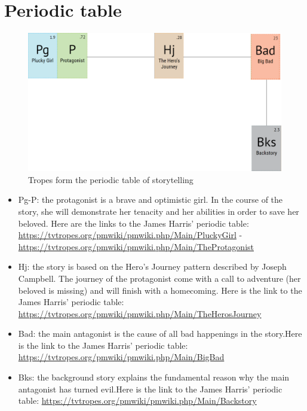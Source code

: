 \section{Periodic table}

\begin{figure}[H]
  \centering
  \includegraphics[width=\textwidth]{Images/Diagrams/periodicTable}
  \caption{Tropes form the periodic table of storytelling}
\end{figure}

\begin{itemize}
\item Pg-P: the protagonist is a brave and optimistic girl. In the course of the story, she will demonstrate her tenacity and her abilities in order to save her beloved. Here are the links to the James Harris' periodic table: \url{https://tvtropes.org/pmwiki/pmwiki.php/Main/PluckyGirl} - \url{https://tvtropes.org/pmwiki/pmwiki.php/Main/TheProtagonist}

\item Hj: the story is based on the Hero's Journey pattern described by Joseph Campbell. The journey of the protagonist come with a call to adventure (her beloved is missing) and will finish with a homecoming. Here is the link to the James Harris' periodic table: \url{https://tvtropes.org/pmwiki/pmwiki.php/Main/TheHerosJourney}

\item Bad: the main antagonist is the cause of all bad happenings in the story.Here is the link to the James Harris' periodic table: \url{https://tvtropes.org/pmwiki/pmwiki.php/Main/BigBad}

\item Bks: the background story explains the fundamental reason why the main antagonist has turned evil.Here is the link to the James Harris' periodic table: \url{https://tvtropes.org/pmwiki/pmwiki.php/Main/Backstory}
\end{itemize}
